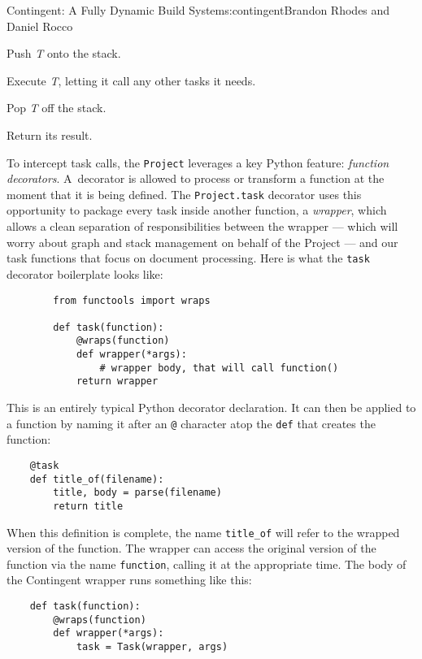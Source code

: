 \begin{aosachapter}{Contingent: A Fully Dynamic Build System}{s:contingent}{Brandon Rhodes and Daniel Rocco}
\begin{aosaenumerate}
\def\labelenumi{\arabic{enumi}.}

\item
  Push \emph{T} onto the stack.
\item
  Execute \emph{T}, letting it call any other tasks it needs.
\item
  Pop \emph{T} off the stack.
\item
  Return its result.
\end{aosaenumerate}

To intercept task calls, the \texttt{Project} leverages a key Python
feature: \emph{function decorators}. A~decorator is allowed to process
or transform a function at the moment that it is being defined. The
\texttt{Project.task} decorator uses this opportunity to package every
task inside another function, a \emph{wrapper}, which allows a clean
separation of responsibilities between the wrapper --- which will worry
about graph and stack management on behalf of the Project --- and our
task functions that focus on document processing. Here is what the
\texttt{task} decorator boilerplate looks like:

\begin{verbatim}
        from functools import wraps

        def task(function):
            @wraps(function)
            def wrapper(*args):
                # wrapper body, that will call function()
            return wrapper
\end{verbatim}

This is an entirely typical Python decorator declaration. It can then be
applied to a function by naming it after an \texttt{@} character atop
the \texttt{def} that creates the function:

\begin{verbatim}
    @task
    def title_of(filename):
        title, body = parse(filename)
        return title
\end{verbatim}

When this definition is complete, the name \texttt{title\_of} will refer
to the wrapped version of the function. The wrapper can access the
original version of the function via the name \texttt{function}, calling
it at the appropriate time. The body of the Contingent wrapper runs
something like this:

\begin{verbatim}
    def task(function):
        @wraps(function)
        def wrapper(*args):
            task = Task(wrapper, args)


\end{verbatim}
\end{aosachapter}

